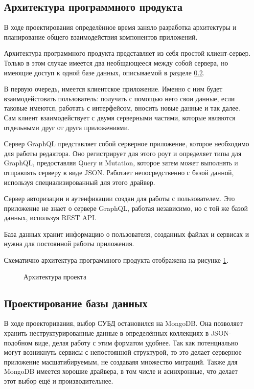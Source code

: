 \subsection{Архитектура программного продукта}

В ходе проектирования определённое время заняло разработка архитектуры и планирование общего взаимодействия компонентов приложений.

Архитектура программного продукта представляет из себя простой клиент-сервер. Только в этом случае имеется два необщающееся между собой сервера, но имеющие
доступ к одной базе данных, описываемой в разделе \ref{des:bd_section}.

В первую очередь, имеется клиентское приложение. Именно с ним будет взаимодейстовать пользователь: получать с помощью него свои данные, если таковые имеются,
работать с интерфейсом, вносить новые данные и так далее. Сам клиент взаимодействует с двумя серверными частями, которые являются отдельными друг от друга приложениями.

Сервер GraphQL представляет собой серверное приложение, которое необходимо для работы редактора. Оно регистрирует для этого роут и определяет типы для GraphQL, предоставляя
Query и Mutation, которое затем может выполнять и отправлять серверу в виде JSON. Работает непосредственно с базой данной, используя специализированный для этого драйвер.

Сервер авторизации и аутенфикации создан для работы с пользователем. Это приложение не знает о сервере GraphQL, работая независимо, но с той же базой данных, используя
REST API.

База данных хранит информацию о пользователя, созданных файлах и сервисах и нужна для постоянной работы приложения.

Схематично архитектура программного продукта отображена на рисунке \ref{des:arch}.

\begin{figure}[H]
    \caption{Архитектура проекта}
    \label{des:arch}
\end{figure}

\subsection{Проектирование базы данных}

\label{des:bd_section}

В ходе проекторивания, выбор СУБД остановился на MongoDB. Она позволяет хранить неструктурированные данные в определённых коллекциях в JSON-подобном виде, делая работу с этим форматом удобнее.
Так как потенциально могут возникнуть сервисы с непостоянной структурой, то это делает серверное приложение масшатибируемым, не создаваяя множество миграций. Также для MongoDB имеется
хорошие драйвера, в том числе и асинхронные, что делает этот выбор ещё и производительнее.

